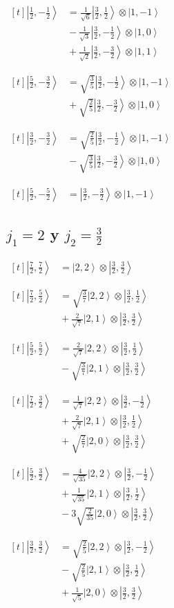 \documentclass[11pt,a4paper]{article}
\newcommand{\estadocelda}[1]{%
  \begin{minipage}[t]{0.48\linewidth}
  \small\raggedright
  \(\displaystyle\begin{aligned}[t]#1\end{aligned}\)
  \end{minipage}%
}
\newcommand{\ket}[1]{\left|#1\right\rangle}
\begin{document}
\noindent\estadocelda{
\ket{\frac{1}{2},-\frac{1}{2}} &= \frac{1}{\sqrt{6}}\ket{\frac{3}{2},\frac{1}{2}}\otimes\ket{1,-1} \\
 &{}-\frac{1}{\sqrt{3}}\ket{\frac{3}{2},-\frac{1}{2}}\otimes\ket{1,0} \\
 &{}+\frac{1}{\sqrt{2}}\ket{\frac{3}{2},-\frac{3}{2}}\otimes\ket{1,1}
}\hfill\estadocelda{
\ket{\frac{5}{2},-\frac{3}{2}} &= \sqrt{\frac{3}{5}}\ket{\frac{3}{2},-\frac{1}{2}}\otimes\ket{1,-1} \\
 &{}+\sqrt{\frac{2}{5}}\ket{\frac{3}{2},-\frac{3}{2}}\otimes\ket{1,0}
}\par\addvspace{1.4em}

\noindent\estadocelda{
\ket{\frac{3}{2},-\frac{3}{2}} &= \sqrt{\frac{2}{5}}\ket{\frac{3}{2},-\frac{1}{2}}\otimes\ket{1,-1} \\
 &{}-\sqrt{\frac{3}{5}}\ket{\frac{3}{2},-\frac{3}{2}}\otimes\ket{1,0}
}\hfill\estadocelda{
\ket{\frac{5}{2},-\frac{5}{2}} &= \ket{\frac{3}{2},-\frac{3}{2}}\otimes\ket{1,-1}
}\par\addvspace{1.4em}

\subsection{\texorpdfstring{$j_1=2$ y $j_2=\frac{3}{2}$}{j1=2 y j2=3/2}}

\noindent\estadocelda{
\ket{\frac{7}{2},\frac{7}{2}} &= \ket{2,2}\otimes\ket{\frac{3}{2},\frac{3}{2}}
}\hfill\estadocelda{
\ket{\frac{7}{2},\frac{5}{2}} &= \sqrt{\frac{3}{7}}\ket{2,2}\otimes\ket{\frac{3}{2},\frac{1}{2}} \\
 &{}+\frac{2}{\sqrt{7}}\ket{2,1}\otimes\ket{\frac{3}{2},\frac{3}{2}}
}\par\addvspace{1.4em}

\noindent\estadocelda{
\ket{\frac{5}{2},\frac{5}{2}} &= \frac{2}{\sqrt{7}}\ket{2,2}\otimes\ket{\frac{3}{2},\frac{1}{2}} \\
 &{}-\sqrt{\frac{3}{7}}\ket{2,1}\otimes\ket{\frac{3}{2},\frac{3}{2}}
}\hfill\estadocelda{
\ket{\frac{7}{2},\frac{3}{2}} &= \frac{1}{\sqrt{7}}\ket{2,2}\otimes\ket{\frac{3}{2},-\frac{1}{2}} \\
 &{}+\frac{2}{\sqrt{7}}\ket{2,1}\otimes\ket{\frac{3}{2},\frac{1}{2}} \\
 &{}+\sqrt{\frac{2}{7}}\ket{2,0}\otimes\ket{\frac{3}{2},\frac{3}{2}}
}\par\addvspace{1.4em}

\noindent\estadocelda{
\ket{\frac{5}{2},\frac{3}{2}} &= \frac{4}{\sqrt{35}}\ket{2,2}\otimes\ket{\frac{3}{2},-\frac{1}{2}} \\
 &{}+\frac{1}{\sqrt{35}}\ket{2,1}\otimes\ket{\frac{3}{2},\frac{1}{2}} \\
 &{}-3\sqrt{\frac{2}{35}}\ket{2,0}\otimes\ket{\frac{3}{2},\frac{3}{2}}
}\hfill\estadocelda{
\ket{\frac{3}{2},\frac{3}{2}} &= \sqrt{\frac{2}{5}}\ket{2,2}\otimes\ket{\frac{3}{2},-\frac{1}{2}} \\
 &{}-\sqrt{\frac{2}{5}}\ket{2,1}\otimes\ket{\frac{3}{2},\frac{1}{2}} \\
 &{}+\frac{1}{\sqrt{5}}\ket{2,0}\otimes\ket{\frac{3}{2},\frac{3}{2}}
}\par\addvspace{1.4em}
\end{document}
